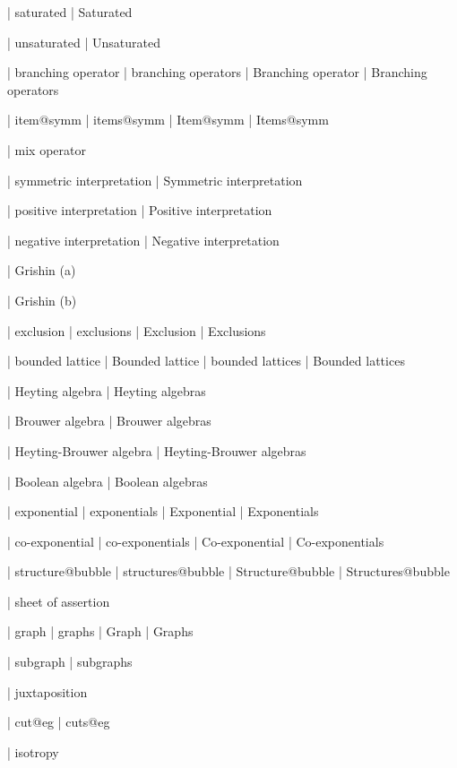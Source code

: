  | saturated
 | Saturated

 | unsaturated
 | Unsaturated

 | branching operator
 | branching operators
 | Branching operator
 | Branching operators

 | item@symm
 | items@symm
 | Item@symm
 | Items@symm

 | mix operator
 
 | symmetric interpretation
 | Symmetric interpretation

 | positive interpretation
 | Positive interpretation

 | negative interpretation
 | Negative interpretation

 | Grishin (a)

 | Grishin (b)

 | exclusion
 | exclusions
 | Exclusion
 | Exclusions
 
 | bounded lattice
 | Bounded lattice
 | bounded lattices
 | Bounded lattices

 | Heyting algebra
 | Heyting algebras

 | Brouwer algebra
 | Brouwer algebras

 | Heyting-Brouwer algebra
 | Heyting-Brouwer algebras

 | Boolean algebra
 | Boolean algebras

 | exponential
 | exponentials
 | Exponential
 | Exponentials

 | co-exponential
 | co-exponentials
 | Co-exponential
 | Co-exponentials

 | structure@bubble
 | structures@bubble
 | Structure@bubble
 | Structures@bubble


 | sheet of assertion
 
 | graph
 | graphs
 | Graph
 | Graphs

 | subgraph
 | subgraphs

 | juxtaposition

 | cut@eg
 | cuts@eg

 | isotropy

